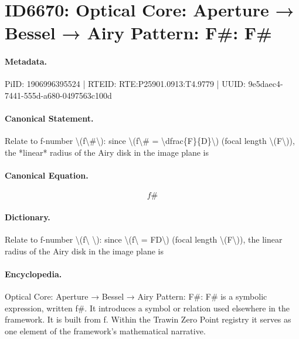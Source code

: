\section*{ID6670: Optical Core: Aperture → Bessel → Airy Pattern: F\#: F\#}
\paragraph{Metadata.}
PiID: 1906996395524 | RTEID: RTE:P25901.0913:T4.9779 | UUID: 9e5daec4-7441-555d-a680-0497563c100d

\paragraph{Canonical Statement.}
Relate to f-number \textbackslash{}(f\textbackslash{}\#\textbackslash{}): since \textbackslash{}(f\textbackslash{}\# = \textbackslash{}dfrac\{F\}\{D\}\textbackslash{}) (focal length \textbackslash{}(F\textbackslash{})), the *linear* radius of the Airy disk in the image plane is

\paragraph{Canonical Equation.}
\[
f\#
\]

\paragraph{Dictionary.}
Relate to f-number \textbackslash{}(f\textbackslash{} \textbackslash{}): since \textbackslash{}(f\textbackslash{} = FD\textbackslash{}) (focal length \textbackslash{}(F\textbackslash{})), the linear radius of the Airy disk in the image plane is

\paragraph{Encyclopedia.}
Optical Core: Aperture → Bessel → Airy Pattern: F\#: F\# is a symbolic expression, written f\#. It introduces a symbol or relation used elsewhere in the framework. It is built from f. Within the Trawin Zero Point registry it serves as one element of the framework's mathematical narrative.
